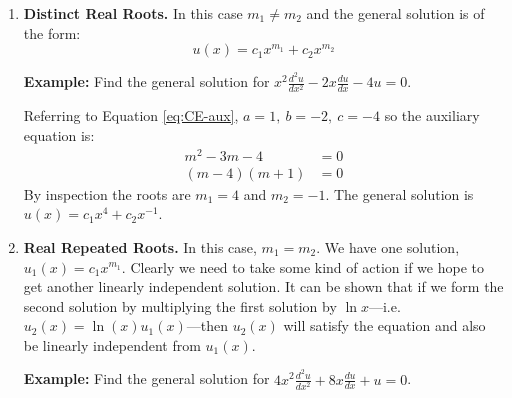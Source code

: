 \begin{enumerate}
\item \textbf{Distinct Real Roots.} In this case $m_1 \ne m_2$ and the general solution is of the form:
\begin{equation}
u(x)=c_1x^{m_1}+c_2x^{m_2}
\end{equation}

\vspace{0.5cm}

\noindent\textbf{Example:} Find the general solution for $x^2\frac{d^2u}{dx^2}-2x\frac{du}{dx}-4u=0$.

\vspace{0.25cm}

\noindent Referring to Equation \ref{eq:CE-aux}, $a=1,\ b=-2, \ c=-4$ so the auxiliary equation is:
\begin{align*}
m^2-3m-4 &= 0 \\
(m-4)(m+1) &=0
\end{align*}
By inspection the roots are $m_1=4$ and $m_2=-1$.  The general solution is $u(x)=c_1x^4+c_2x^{-1}$.

\vspace{0.5cm}

\item \textbf{Real Repeated Roots.} In this case, $m_1 = m_2$.  We have one solution, $u_1(x)=c_1x^{m_1}$.  Clearly we need to take some kind of action if we hope to get another linearly independent solution.  It can be shown that if we form the second solution by multiplying the first solution by $\ln{x}$---i.e. $u_2(x)=\ln{(x)}u_1(x)$---then $u_2(x)$ will satisfy the equation and also be linearly independent from $u_1(x)$.

\vspace{0.5cm}

\noindent\textbf{Example:} Find the general solution for $4x^2 \frac{d^2u}{dx^2}+8x\frac{du}{dx}+u=0$.


\end{enumerate}
